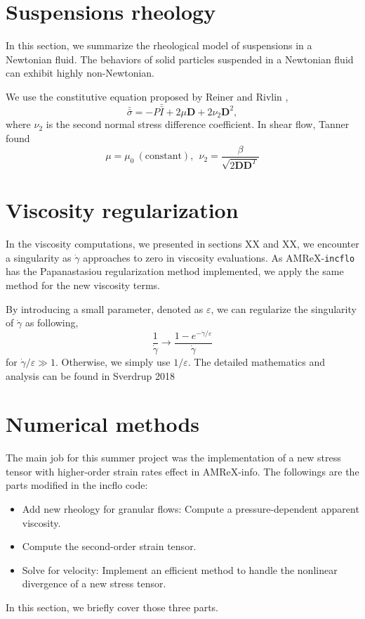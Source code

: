 \section{Suspensions rheology}
In this section, we summarize the rheological model of suspensions in a Newtonian fluid. The behaviors of solid particles suspended in a Newtonian fluid can exhibit highly non-Newtonian.  
\par
We use the constitutive equation proposed by Reiner \cite{reiner_mathematical_1945} and Rivlin \cite{rivlin_stress-deformation_1955},  
\begin{equation}
  \bar{\bar{\sigma}} = -P \bar{\bar{I}}
  + 2 \mu {\bm{D}} + 2 \nu_2 {\bm{D}}^2, 
\end{equation}
where $\nu_2$ is the second normal stress difference coefficient. In shear flow, Tanner found
\begin{equation}
  \mu = \mu_0 \ (\text{constant}), 
  \ \ 
  \nu_2 = \frac{\beta}{\sqrt{2 {\bm D} {\bm D}^T}}
\end{equation}

\section{Viscosity regularization}
In the viscosity computations, we presented in sections XX and XX, we encounter a singularity as $\dot{\gamma}$ approaches to zero in viscosity evaluations. 
As AMReX-\verb+incflo+ has the Papanastasiou regularization method implemented, we apply the same method for the new viscosity terms.
\par
By introducing a small parameter, denoted as $\varepsilon$, we can regularize the singularity of $\dot{\gamma}$ as following,
\[
  \frac{1}{\dot{\gamma}} \rightarrow \frac{1-e^{-\dot{\gamma} / \varepsilon}}{\dot{\gamma}}  
\]
for $\dot{\gamma}/\varepsilon \gg 1$. Otherwise, we simply use $1/\varepsilon$. 
The detailed mathematics and analysis can be found in Sverdrup 2018 \cite{sverdrup_highly_2018}
\section{Numerical methods}
The main job for this summer project was the implementation of a new stress tensor with higher-order strain rates effect in AMReX-info. The followings are the parts modified in the incflo code: 
\begin{itemize}
	\item Add new rheology for granular flows: Compute a pressure-dependent apparent viscosity.
	\item Compute the second-order strain tensor.
	\item Solve for velocity: Implement an efficient method to handle the nonlinear divergence of a new stress tensor.
\end{itemize}
In this section, we briefly cover those three parts.

